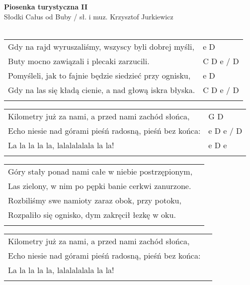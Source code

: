 \documentclass[a5paper]{article}
\begin{document}


\noindent
\fontsize{12pt}{15pt}\selectfont
\textbf{Piosenka turystyczna II} \\
\fontsize{8pt}{10pt}\selectfont
Słodki Całus od Buby / sł. i muz. Krzysztof Jurkiewicz \\ \\
\fontsize{10pt}{12pt}\selectfont
{}
\begin{tabular}{@{}p{9.30cm}p{3cm}@{}}
\noindent
Gdy na rajd wyruszaliśmy, wszyscy byli dobrej myśli, & e D \\
Buty mocno zawiązali i plecaki zarzucili. & C D e / D \\
Pomyśleli, jak to fajnie będzie siedzieć przy ognisku, & e D \\
Gdy na las się kładą cienie, a nad głową iskra błyska. & C D e / D  \\ \\
\end{tabular}

\noindent
\begin{tabular}{@{}p{8.30cm}p{3cm}@{}}
Kilometry już za nami, a przed nami zachód słońca, & G D \\
Echo niesie nad górami pieśń radosną, pieśń bez końca: & e D e / D \\
La la la la la, lalalalalala la la! & e D e \\ \\
\end{tabular}

\noindent
\begin{tabular}{@{}p{10.30cm}p{3cm}@{}}
Góry stały ponad nami całe w niebie postrzępionym, \\
Las zielony, w nim po pępki banie cerkwi zanurzone. \\
Rozbiliśmy swe namioty zaraz obok, przy potoku, \\
Rozpaliło się ognisko, dym zakręcił łezkę w oku. \\ \\
\end{tabular}

\noindent
\begin{tabular}{@{}p{10.30cm}p{3cm}@{}}
Kilometry już za nami, a przed nami zachód słońca, \\
Echo niesie nad górami pieśń radosną, pieśń bez końca: \\
La la la la la, lalalalalala la la! \\ \\
\end{tabular}
\end{document}
